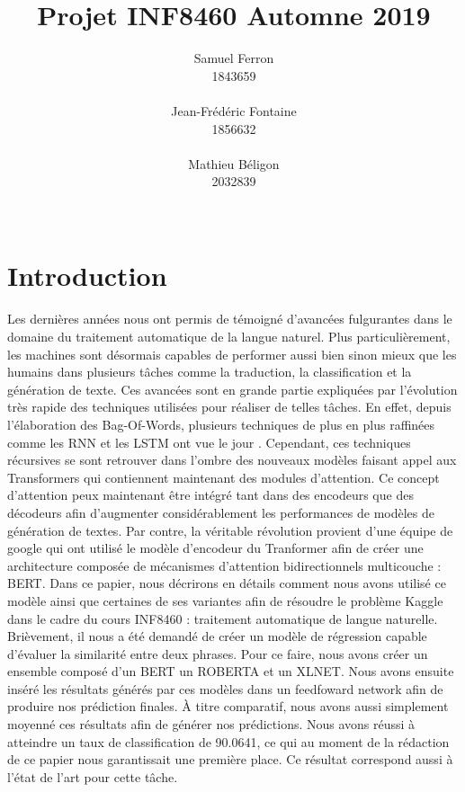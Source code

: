 \documentclass[11pt,a4paper, french]{article}
\title{Projet INF8460 Automne 2019 }
\author{Samuel Ferron \\
  1843659 \\
  {\tt } \\\And
  Jean-Frédéric Fontaine \\
  1856632 \\
  {\tt} \\\And
  Mathieu B\'eligon \\
  2032839\\
  {\tt } \\}
\date{}
\begin{document}
\maketitle

\section{Introduction}

Les dernières années nous ont permis de témoigné d’avancées fulgurantes dans le domaine du traitement automatique de la langue naturel. Plus particulièrement, les machines sont désormais capables de performer aussi bien sinon mieux que les humains dans plusieurs tâches comme la traduction, la classification et la génération de texte. Ces avancées sont en grande partie expliquées par l’évolution très rapide des techniques utilisées pour réaliser de telles tâches. En effet, depuis l’élaboration des Bag-Of-Words, plusieurs techniques de plus en plus raffinées comme les RNN et les LSTM ont vue le jour \cite{lstm}. Cependant, ces techniques récursives se sont retrouver dans l’ombre des nouveaux modèles faisant appel aux Transformers qui contiennent maintenant des modules d’attention. Ce concept d’attention peux maintenant être intégré tant dans des encodeurs que des décodeurs afin d’augmenter considérablement les performances de modèles de génération de textes. Par contre, la véritable révolution provient d’une équipe de google qui ont utilisé le modèle d’encodeur du Tranformer afin de créer une architecture composée de mécanismes d’attention bidirectionnels multicouche : BERT. Dans ce papier, nous décrirons en détails comment nous avons utilisé ce modèle ainsi que certaines de ses variantes afin de résoudre le problème Kaggle dans le cadre du cours INF8460 : traitement automatique de langue naturelle. Brièvement, il nous a été demandé de créer un modèle de régression capable d’évaluer la similarité entre deux phrases. Pour ce faire, nous avons créer un ensemble composé d’un BERT un ROBERTA et un XLNET. Nous avons ensuite inséré les résultats générés par ces modèles dans un feedfoward network afin de produire nos prédiction finales. À titre comparatif, nous avons aussi simplement moyenné ces résultats afin de générer nos prédictions. Nous avons réussi à atteindre un taux de classification de 90.0641, ce qui au moment de la rédaction de ce papier nous garantissait une première place. Ce résultat correspond aussi à l'état de l'art pour cette tâche. 
\end{document}
